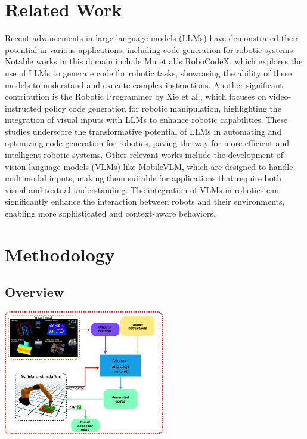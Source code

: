 \documentclass[conference]{IEEEtran}
\begin{document}
\section{Related Work}
Recent advancements in large language models (LLMs) have demonstrated their potential in various applications, including code generation for robotic systems. Notable works in this domain include Mu et al.'s RoboCodeX\cite{mu2024robocodex}, which explores the use of LLMs to generate code for robotic tasks, showcasing the ability of these models to understand and execute complex instructions. Another significant contribution is the Robotic Programmer by Xie et al.\cite{xie2025robotic}, which focuses on video-instructed policy code generation for robotic manipulation, highlighting the integration of visual inputs with LLMs to enhance robotic capabilities. These studies underscore the transformative potential of LLMs in automating and optimizing code generation for robotics, paving the way for more efficient and intelligent robotic systems.
Other relevant works include the development of vision-language models (VLMs) like MobileVLM\cite{chu2023mobilevlm}, which are designed to handle multimodal inputs, making them suitable for applications that require both visual and textual understanding. The integration of VLMs in robotics can significantly enhance the interaction between robots and their environments, enabling more sophisticated and context-aware behaviors.

\section{Methodology}
\subsection{Overview}
\includegraphics[width=7cm]{OJT_fig_1.png}
\end{document}
